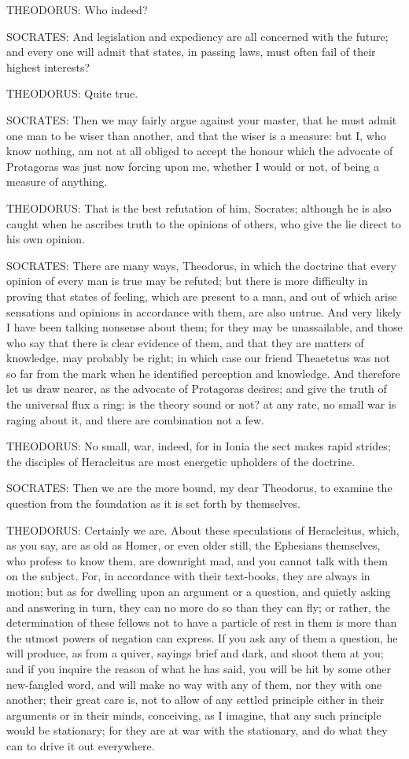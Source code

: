 THEODORUS: Who indeed?

SOCRATES: And legislation and expediency are all concerned with the
future; and every one will admit that states, in passing laws, must
often fail of their highest interests?

THEODORUS: Quite true.

SOCRATES: Then we may fairly argue against your master, that he must
admit one man to be wiser than another, and that the wiser is a measure:
but I, who know nothing, am not at all obliged to accept the honour
which the advocate of Protagoras was just now forcing upon me, whether I
would or not, of being a measure of anything.

THEODORUS: That is the best refutation of him, Socrates; although he is
also caught when he ascribes truth to the opinions of others, who give
the lie direct to his own opinion.

SOCRATES: There are many ways, Theodorus, in which the doctrine that
every opinion of every man is true may be refuted; but there is more
difficulty in proving that states of feeling, which are present to a
man, and out of which arise sensations and opinions in accordance with
them, are also untrue. And very likely I have been talking nonsense
about them; for they may be unassailable, and those who say that there
is clear evidence of them, and that they are matters of knowledge, may
probably be right; in which case our friend Theaetetus was not so far
from the mark when he identified perception and knowledge. And therefore
let us draw nearer, as the advocate of Protagoras desires; and give the
truth of the universal flux a ring: is the theory sound or not? at any
rate, no small war is raging about it, and there are combination not a
few.

THEODORUS: No small, war, indeed, for in Ionia the sect makes rapid
strides; the disciples of Heracleitus are most energetic upholders of
the doctrine.

SOCRATES: Then we are the more bound, my dear Theodorus, to examine the
question from the foundation as it is set forth by themselves.

THEODORUS: Certainly we are. About these speculations of Heracleitus,
which, as you say, are as old as Homer, or even older still, the
Ephesians themselves, who profess to know them, are downright mad, and
you cannot talk with them on the subject. For, in accordance with their
text-books, they are always in motion; but as for dwelling upon an
argument or a question, and quietly asking and answering in turn, they
can no more do so than they can fly; or rather, the determination of
these fellows not to have a particle of rest in them is more than
the utmost powers of negation can express. If you ask any of them a
question, he will produce, as from a quiver, sayings brief and dark, and
shoot them at you; and if you inquire the reason of what he has said,
you will be hit by some other new-fangled word, and will make no way
with any of them, nor they with one another; their great care is, not
to allow of any settled principle either in their arguments or in
their minds, conceiving, as I imagine, that any such principle would be
stationary; for they are at war with the stationary, and do what they
can to drive it out everywhere.

